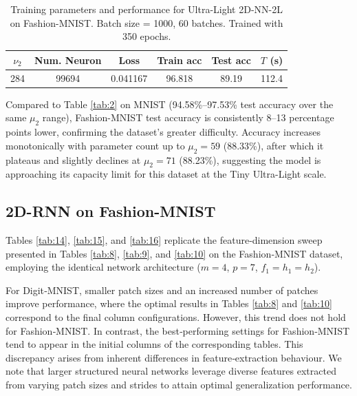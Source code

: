 \documentclass[pdflatex,sn-mathphys-num]{sn-jnl}%
\theoremstyle{thmstyleone}%
\theoremstyle{thmstyletwo}%
\theoremstyle{thmstylethree}%
\begin{document}
\begin{table}[htbp]
\centering
\caption{Training parameters and performance for Ultra-Light 2D-NN-2L on Fashion-MNIST.
Batch size = 1000, 60 batches. Trained with 350 epochs.}
\label{tab:fashion14}
\begin{tabular}{|c|c|c|c|c|c|}
\hline
$\nu_2$ & Num. Neuron & Loss    & Train acc & Test acc & $T$ (s) \\
\hline
284 & 99694&  0.041167    & 96.818
& 89.19& 112.4 \\               
\hline
\end{tabular}
\end{table}   


Compared to Table \ref{tab:2} on MNIST (94.58\%--97.53\% test accuracy over the same $\mu_2$ range), Fashion-MNIST test accuracy is consistently 8--13 percentage points lower, confirming the dataset's greater difficulty. Accuracy increases monotonically with parameter count up to $\mu_2=59$ (88.33\%), after which it plateaus and slightly declines at $\mu_2=71$ (88.23\%), suggesting the model is approaching its capacity limit for this dataset at the Tiny Ultra-Light scale.


\subsection{2D-RNN on Fashion-MNIST}

Tables \ref{tab:14}, \ref{tab:15}, and \ref{tab:16} replicate the feature‑dimension sweep presented in Tables \ref{tab:8}, \ref{tab:9}, and \ref{tab:10} on the Fashion‑MNIST dataset, employing the identical network architecture ($m=4$, $p=7$, $f_1=h_1=h_2$).

For Digit‑MNIST, smaller patch sizes and an increased number of patches improve performance, where the optimal results in Tables \ref{tab:8} and \ref{tab:10} correspond to the final column configurations. However, this trend does not hold for Fashion‑MNIST. In contrast, the best‑performing settings for Fashion‑MNIST tend to appear in the initial columns of the corresponding tables. This discrepancy arises from inherent differences in feature‑extraction behaviour. We note that larger structured neural networks leverage diverse features extracted from varying patch sizes and strides to attain optimal generalization performance.


\end{document}
